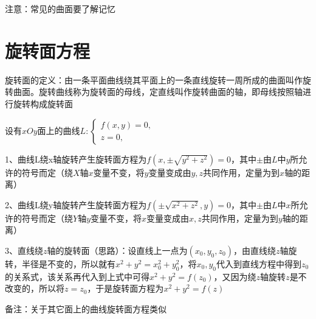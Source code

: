 注意：常见的曲面要了解记忆

\section{旋转面方程}

旋转面的定义：由一条平面曲线绕其平面上的一条直线旋转一周所成的曲面叫作旋转曲面。旋转曲线称为旋转面的母线，定直线叫作旋转曲面的轴，即母线按照轴进行旋转构成旋转面

设有$x O y$面上的曲线$L:\left\{\begin{array}{l}f(x, y)=0, \\ z=0,\end{array}\right.$

1、曲线L绕x轴旋转产生旋转面方程为$f\left(x, \pm \sqrt{y^{2}+z^{2}}\right)=0$，其中$\pm$由$L$中$y$所允许的符号而定（绕$X$轴$x$变量不变，将$y$变量变成由$y,z$共同作用，定量为到$x$轴的距离）

2、曲线L绕y轴旋转产生旋转面方程为$f\left(\pm \sqrt{x^{2}+z^{2}}, y\right)=0$，其中$\pm$由$L$中$x$所允许的符号而定（绕$Y$轴$y$变量不变，将$x$变量变成由$x,z$共同作用，定量为到$y$轴的距离）

3、直线绕$z$轴的旋转面（思路）：设直线上一点为$\left(x_{0}, y_{0}, z_{0}\right)$，由直线绕$z$轴旋转，半径是不变的，所以就有$x^2+y^2 = x_{0}^2+y_{0}^2$，将$x_{0}, y_{0}$代入到直线方程中得到$z_{0}$的关系式，该关系再代入到上式中可得$x^2+y^2 = f(z_{0})$，又因为绕$z$轴旋转$z$是不改变的，所以将$z=z_{0}$，于是旋转面方程为$x^2+y^2 = f(z)$

备注：关于其它面上的曲线旋转面方程类似

